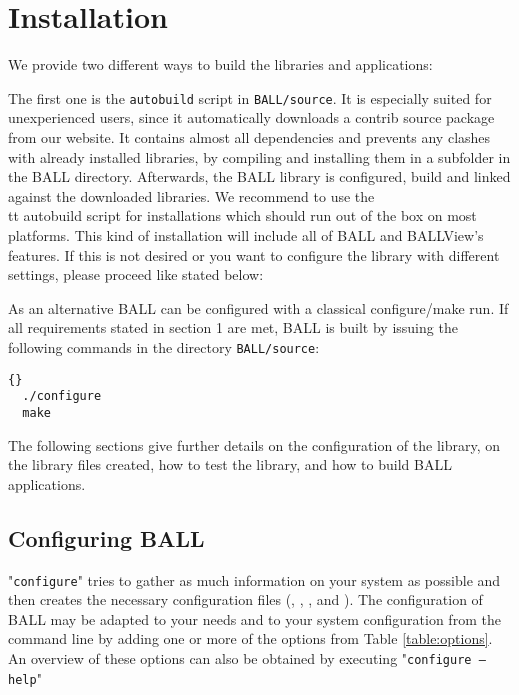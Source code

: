 \section{Installation}
\label{section:building-ball}

We provide two different ways to build the libraries and applications:

The first one is the {\tt autobuild} script in {\tt BALL/source}. It is
especially suited for unexperienced users, since it automatically downloads a
contrib source package from our website. It contains almost all dependencies
and prevents any clashes with already installed libraries, by compiling and
installing them in a subfolder in the BALL directory. Afterwards, the BALL
library is configured, build and linked against the downloaded libraries. We
recommend to use the {\\tt autobuild} script for installations which should run
out of the box on most platforms. This kind of installation will include all of
BALL and BALLView's features. If this is not desired or you want to configure
the library with different settings, please proceed like stated below:

As an alternative BALL can be configured with a classical configure/make
run. If all requirements stated in section 1 are met, BALL is built by 
issuing the following commands in the directory {\tt BALL/source}:

\begin{lstlisting}{}
  ./configure
  make
\end{lstlisting}

The following sections give further details on the configuration of the library,
on the library files created, how to test the library, and how to build BALL 
applications.

\subsection{Configuring BALL}

"{\tt configure}" tries to gather as much information on your system as possible and 
then creates the necessary configuration files (,
, , and ).
The configuration of BALL may be adapted to your needs and to your system
configuration from the command line by adding one or more of the options from
Table \ref{table:options}.
An overview of these options can also be obtained by executing "{\tt configure
--help}"

